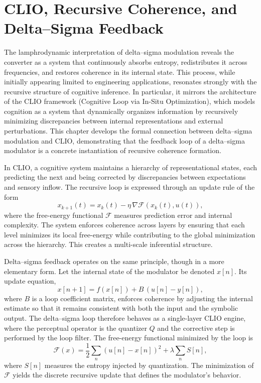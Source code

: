 
\chapter{CLIO, Recursive Coherence, and Delta–Sigma Feedback}

The lamphrodynamic interpretation of delta–sigma modulation reveals the converter as a system that continuously absorbs entropy, redistributes it across frequencies, and restores coherence in its internal state. This process, while initially appearing limited to engineering applications, resonates strongly with the recursive structure of cognitive inference. In particular, it mirrors the architecture of the CLIO framework (Cognitive Loop via In-Situ Optimization), which models cognition as a system that dynamically organizes information by recursively minimizing discrepancies between internal representations and external perturbations. This chapter develops the formal connection between delta–sigma modulation and CLIO, demonstrating that the feedback loop of a delta–sigma modulator is a concrete instantiation of recursive coherence formation.

In CLIO, a cognitive system maintains a hierarchy of representational states, each predicting the next and being corrected by discrepancies between expectations and sensory inflow. The recursive loop is expressed through an update rule of the form
\[
x_{k+1}(t) = x_{k}(t) - \eta \, \nabla \mathcal{F}(x_{k}(t), u(t)),
\]
where the free-energy functional \(\mathcal{F}\) measures prediction error and internal complexity. The system enforces coherence across layers by ensuring that each level minimizes its local free-energy while contributing to the global minimization across the hierarchy. This creates a multi-scale inferential structure.

Delta–sigma feedback operates on the same principle, though in a more elementary form. Let the internal state of the modulator be denoted \(x[n]\). Its update equation,
\[
x[n+1] = f(x[n]) + B\,(u[n] - y[n]),
\]
where \(B\) is a loop coefficient matrix, enforces coherence by adjusting the internal estimate so that it remains consistent with both the input and the symbolic output. The delta–sigma loop therefore behaves as a single-layer CLIO engine, where the perceptual operator is the quantizer \(Q\) and the corrective step is performed by the loop filter. The free-energy functional minimized by the loop is
\[
\mathcal{F}(x) = \frac{1}{2}\sum_{n} (u[n] - x[n])^{2} + \lambda \sum_{n} S[n],
\]
where \(S[n]\) measures the entropy injected by quantization. The minimization of \(\mathcal{F}\) yields the discrete recursive update that defines the modulator's behavior.


